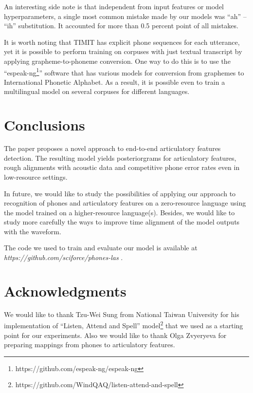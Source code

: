 \documentclass[a4paper]{article}
\begin{document}
An interesting side note is that independent from input features or model hyperparameters, a single most common mistake made by our models was ``ah'' -- ``ih'' substitution. It accounted for more than 0.5 percent point of all mistakes.

It is worth noting that TIMIT has explicit phone sequences for each utterance, yet it is possible to perform training on corpuses with just textual transcript by applying grapheme-to-phoneme conversion. One way to do this is to use the ``espeak-ng\footnote{https://github.com/espeak-ng/espeak-ng}'' software that has various models for conversion from graphemes to International Phonetic Alphabet. As a result, it is possible even to train a multilingual model on several corpuses for different languages.

\section{Conclusions}
The paper proposes a novel approach to end-to-end articulatory features detection. The resulting model yields posteriorgrams for articulatory features, rough alignments with acoustic data and competitive phone error rates even in low-resource settings.

In future, we would like to study the possibilities of applying our approach to recognition of phones and articulatory features on a zero-resource language using the model trained on a higher-resource language(s). Besides, we would like to study more carefully the ways to improve time alignment of the model outputs with the waveform.

The code we used to train and evaluate our model is available at \textit{https://github.com/sciforce/phones-las} .

\section{Acknowledgments}
We would like to thank Tzu-Wei Sung from National Taiwan University for his implementation of ``Listen, Attend and Spell'' model\footnote{https://github.com/WindQAQ/listen-attend-and-spell} that we used as a starting point for our experiments. Also we would like to thank Olga Zvyeryeva for preparing mappings from phones to articulatory features.



\end{document}

